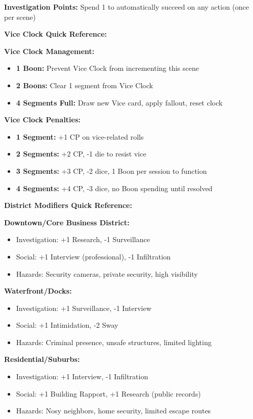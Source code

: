\documentclass[11pt]{article}
\begin{document}
\textbf{Investigation Points:} Spend 1 to automatically succeed on any action (once per scene)

\textbf{Vice Clock Quick Reference:}

\textbf{Vice Clock Management:}
\begin{itemize}
    \item \textbf{1 Boon:} Prevent Vice Clock from incrementing this scene
    \item \textbf{2 Boons:} Clear 1 segment from Vice Clock
    \item \textbf{4 Segments Full:} Draw new Vice card, apply fallout, reset clock
\end{itemize}

\textbf{Vice Clock Penalties:}
\begin{itemize}
    \item \textbf{1 Segment:} +1 CP on vice-related rolls
    \item \textbf{2 Segments:} +2 CP, -1 die to resist vice
    \item \textbf{3 Segments:} +3 CP, -2 dice, 1 Boon per session to function
    \item \textbf{4 Segments:} +4 CP, -3 dice, no Boon spending until resolved
\end{itemize}

\textbf{District Modifiers Quick Reference:}

\textbf{Downtown/Core Business District:}
\begin{itemize}
    \item Investigation: +1 Research, -1 Surveillance
    \item Social: +1 Interview (professional), -1 Infiltration
    \item Hazards: Security cameras, private security, high visibility
\end{itemize}

\textbf{Waterfront/Docks:}
\begin{itemize}
    \item Investigation: +1 Surveillance, -1 Interview
    \item Social: +1 Intimidation, -2 Sway
    \item Hazards: Criminal presence, unsafe structures, limited lighting
\end{itemize}

\textbf{Residential/Suburbs:}
\begin{itemize}
    \item Investigation: +1 Interview, -1 Infiltration
    \item Social: +1 Building Rapport, +1 Research (public records)
    \item Hazards: Nosy neighbors, home security, limited escape routes
\end{itemize}
\end{document}
